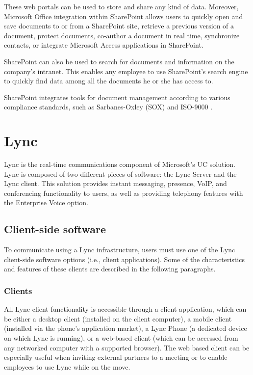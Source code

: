 These web portals can be used to store and share any kind of data. Moreover, Microsoft Office integration within SharePoint allows users to quickly open and save documents to or from a SharePoint site, retrieve a previous version of a document, protect documents, co-author a document in real time, synchronize contacts, or integrate Microsoft Access applications in SharePoint.

SharePoint can also be used to search for documents and information on the company's intranet. This enables any employee to use SharePoint's search engine to quickly find data among all the documents he or she has access to.

SharePoint integrates tools for document management according to various compliance standards, such as Sarbanes-Oxley (SOX) and ISO-9000
\cite[Ch. 1]{husman_beginning_2010}.



\section{Lync}

Lync is the real-time communications component of Microsoft's UC solution. Lync is composed of two different pieces of software: the Lync Server and the Lync client. This solution provides instant messaging, presence, VoIP, and conferencing functionality to users, as well as providing telephony features with the Enterprise Voice option\cite{winters_mastering_2012}.

\subsection{Client-side software}

To communicate using a Lync infrastructure, users must use one of the Lync client-side software options (i.e., client applications). Some of the characteristics and features of these clients are described in the following paragraphs.

\subsubsection{Clients}
All Lync client functionality is accessible through a client application, which can be either a desktop client (installed on the client computer), a mobile client (installed via the phone's application market), a Lync Phone (a dedicated device on which Lync is running), or a web-based client (which can be accessed from any networked computer with a supported browser\cite{microsoft_technet_lync_2013-1}). The web based client can be especially useful when inviting external partners to a meeting or to enable employees to use Lync while on the move\cite[Ch. 1.1]{winters_mastering_2012}.

